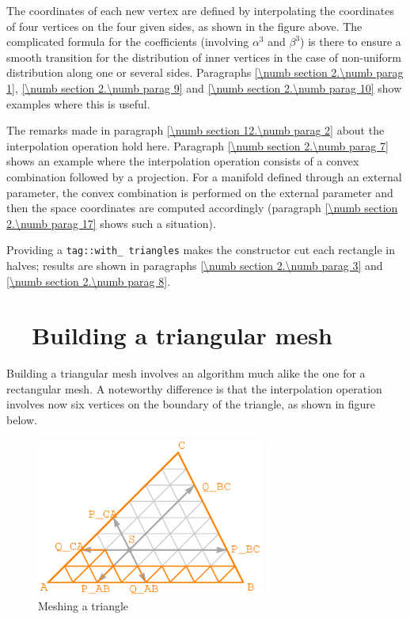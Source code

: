 The coordinates of each new vertex are defined by interpolating the coordinates of four vertices
on the four given sides, as shown in the figure above.
The complicated formula for the coefficients (involving $ \alpha^3 $ and $ \beta^3 $) is there
to ensure a smooth transition for the distribution of inner vertices in the case of non-uniform
distribution along one or several sides.
Paragraphs \ref{\numb section 2.\numb parag 1}, \ref{\numb section 2.\numb parag 9} and
\ref{\numb section 2.\numb parag 10} show examples where this is useful.

The remarks made in paragraph \ref{\numb section 12.\numb parag 2} about
the interpolation operation hold here.
Paragraph \ref{\numb section 2.\numb parag 7} shows an example where the interpolation operation
consists of a convex combination followed by a projection.
For a manifold defined through an external parameter, the convex combination is performed
on the external parameter and then the space coordinates are computed accordingly
(paragraph \ref{\numb section 2.\numb parag 17} shows such a situation).

Providing a {\small\tt \textcolor{tag}{tag}::with\_\,triangles} makes the constructor cut each rectangle
in halves; results are shown in paragraphs \ref{\numb section 2.\numb parag 3} and
\ref{\numb section 2.\numb parag 8}.


\section{~~Building a triangular mesh}\label{\numb section 12.\numb parag 4}

Building a triangular mesh involves an algorithm much alike the one for a rectangular mesh.
A noteworthy difference is that the interpolation operation involves now six vertices on
the boundary of the triangle, as shown in figure below.

\begin{figure}[ht] \centering
  \includegraphics[width=75mm]{fig-triangle}
  \caption{Meshing a triangle}
  \label{\numb section 12.\numb fig 2}
\end{figure}

